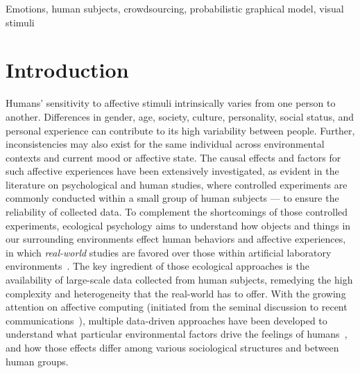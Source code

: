 \documentclass[10pt,journal,letterpaper,compsoc,twoside]{IEEEtran}
\begin{document}
\begin{IEEEkeywords}
Emotions, human subjects, crowdsourcing, probabilistic graphical model, visual stimuli
\end{IEEEkeywords}

\IEEEpeerreviewmaketitle

\section{Introduction}
Humans' sensitivity to affective stimuli intrinsically varies from one person
to another. Differences in gender, age, society, culture, personality, 
social status, and personal experience can contribute to its 
high variability between people. Further, inconsistencies 
may also exist for the same individual across environmental contexts and current mood or affective state. 
The {causal} effects and factors for such affective experiences 
have been extensively investigated, as evident in the literature on 
psychological and human studies, where controlled 
experiments are commonly conducted within a small group
of human subjects --- to ensure the reliability of collected data. 
To complement the shortcomings of those 
controlled experiments, ecological psychology 
aims to understand how objects and things 
in our surrounding environments effect human behaviors and affective experiences,
in which {\it real-world} studies are favored over those within
artificial laboratory environments~\citep{barker1968ecological,gibson1966senses}.
The key ingredient of those ecological approaches is the availability of
large-scale data collected from human subjects, 
remedying the high complexity and heterogeneity that 
the real-world has to offer. With the growing attention
on affective computing (initiated from the seminal discussion \citep{picard1997affective} to 
recent communications~\citep{marsella2014computationally}),
multiple data-driven approaches have been developed to understand
what particular environmental factors drive the feelings of humans~\citep{datta2006studying,lu2012shape},
and how those effects differ among various sociological 
structures and between human groups.%
\end{document}
